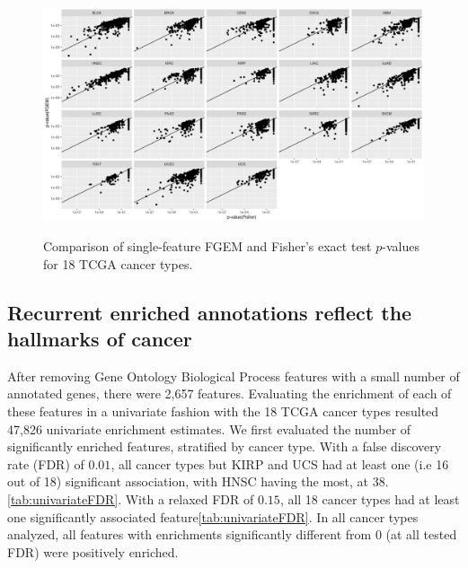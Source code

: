 \begin{figure}
\centering
\includegraphics[width=.9\linewidth]{img/fisher_vs_fgem.png}\label{fig:fisher_vs_fgem}
\caption{Comparison of single-feature FGEM and Fisher's exact test $p$-values for 18 TCGA cancer types.}
\end{figure}

\subsection{Recurrent enriched annotations reflect the hallmarks of cancer}\label{sec:orgd52f2ca}

After removing Gene Ontology Biological Process features with a small number of annotated genes, there were 2,657 features.  Evaluating the enrichment of each of these features in a univariate fashion with the 18 TCGA cancer types resulted 47,826 univariate enrichment estimates.  We first evaluated the number of significantly enriched features, stratified by cancer type.  With a false discovery rate (FDR) of $0.01$, all cancer types but KIRP and UCS had at least one (i.e 16 out of 18) significant association, with HNSC having the most, at 38.\ref{tab:univariateFDR}.  With a relaxed FDR of $0.15$, all 18 cancer types had at least one significantly associated feature\ref{tab:univariateFDR}. In all cancer types analyzed, all features with enrichments significantly different from 0 (at all tested FDR) were positively enriched.  


